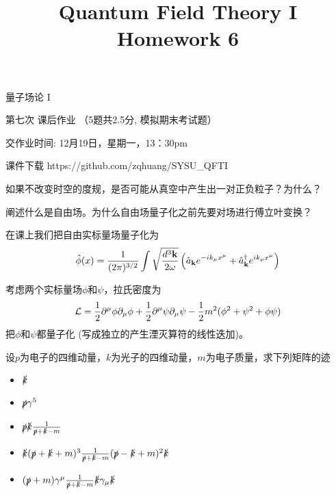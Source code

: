 \documentclass[CJK]{beamer}
\title{Quantum Field Theory I \\ Homework 6}
\author{}
\date{}
\begin{document}
\begin{frame}
 
\begin{center}
\begin{Large}
\bch
量子场论 I 

{\vskip 0.3in}

第七次 课后作业 （5题共2.5分, 模拟期末考试题）

交作业时间: 12月19日，星期一，13：30pm

\ech
\end{Large}
\end{center}

\vskip 0.2in

\bch
课件下载
\ech
https://github.com/zqhuang/SYSU\_QFTI

\end{frame}


\begin{frame}
\bch
如果不改变时空的度规，是否可能从真空中产生出一对正负粒子？为什么？
\ech
\end{frame}

\begin{frame}
\bch
阐述什么是自由场。为什么自由场量子化之前先要对场进行傅立叶变换？
\ech
\end{frame}

\begin{frame}
\bch
在课上我们把自由实标量场量子化为
$$ {\hat{\phi}}(x) = \frac{1}{(2\pi)^{3/2}} \int \sqrt{\frac{d^3{\mathbf{k}}}{2\omega}} \left({\hat{a}}_{{\mathbf{k}}} e^{-ik_\mu x^\mu} + {\hat{a}^\dagger}_{{\mathbf{k}}}e^{ik_\mu x^\mu}\right) $$

考虑两个实标量场$\phi$和$\psi$，拉氏密度为
$${\mathcal{L}} = \frac{1}{2}\partial^\mu\phi\partial_\mu\phi + \frac{1}{2}\partial^\mu\psi\partial_\mu\psi - \frac{1}{2}m^2(\phi^2+\psi^2+\phi\psi) $$
把$\phi$和$\psi$都量子化 (写成独立的产生湮灭算符的线性迭加)。
\ech
\end{frame}


\begin{frame}
\bch
设$p$为电子的四维动量，$k$为光子的四维动量，$m$为电子质量，求下列矩阵的迹
\begin{itemize}
\item{$\slashed{k}$}
\item{$\slashed{p}\gamma^5$}
\item{$\slashed{p}\slashed{k}\frac{1}{\slashed{p}+\slashed{k}-m}$}
\item{$\slashed{k}(\slashed{p}+\slashed{k}+m)^3\frac{1}{\slashed{p}+\slashed{k}-m}(\slashed{p}-\slashed{k}+m)^2\slashed{k}$}
\item{$(\slashed{p}+m)\gamma^\mu\frac{1}{\slashed{p}+\slashed{k} -m}\slashed{k}\gamma_\mu\slashed{k}$}
\end{itemize}
\ech
\end{frame}
\end{document}
